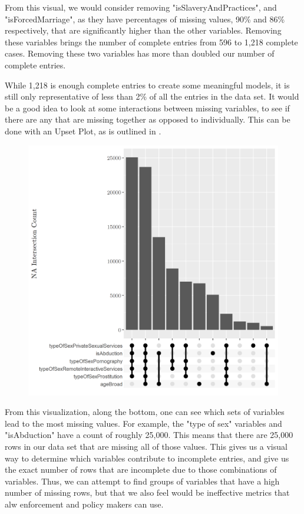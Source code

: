 \documentclass{article} %
\begin{document}
From this visual, we would consider removing "isSlaveryAndPractices", and "isForcedMarriage", as they have percentages of missing values, 90\% and 86\% respectively, that are significantly higher than the other variables. Removing these variables brings the number of complete entries from 596 to 1,218 complete cases. Removing these two variables has more than doubled our number of complete entries.

While 1,218 is enough complete entries to create some meaningful models, it is still only representative of less than 2\% of all the entries in the data set. It would be a good idea to look at some interactions between missing variables, to see if there are any that are missing together as opposed to individually. This can be done with an Upset Plot, as is outlined in \cite{UpsetPlot}.

\begin{figure}[H]
	\includegraphics[width = \textwidth]{UpsetPlt1}
\end{figure}

From this visualization, along the bottom, one can see which sets of variables lead to the most missing values. For example, the "type of sex" variables and "isAbduction" have a count of roughly 25,000. This means that there are 25,000 rows in our data set that are missing all of those values. This gives us a visual way to determine which variables contribute to incomplete entries, and give us the exact number of rows that are incomplete due to those combinations of variables. Thus, we can attempt to find groups of variables that have a high number of missing rows, but that we also feel would be ineffective metrics that alw enforcement and policy makers can use. 
\end{document}

